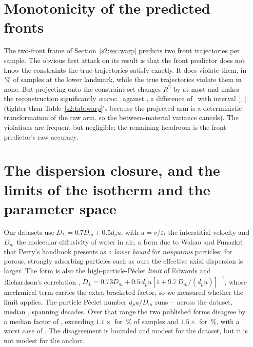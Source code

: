 \section{Monotonicity of the predicted fronts}
\label{s2:sec8}

The two-front frame of Section~\ref{s2:sec:warp} predicts two front trajectories per
sample. The obvious first attack on its result is that the front predictor does not know the constraints the true trajectories satisfy exactly.
It does violate them, in \nWarpNonmonoLo\,\% of samples at the lower landmark, while the true trajectories
violate them in none. But projecting onto the constraint set changes \(R^2\) by
at most \nWarpMonoMaxDRtwo{} and makes the reconstruction significantly
\emph{worse}: \nMonoRawNrmse\ against \nMonoProjNrmse, a difference of
\nMonoDiff\ with interval [\nMonoLo, \nMonoHi] (tighter than Table~\ref{s2:tab:warp}'s
because the projected arm is a deterministic transformation of the raw arm, so the
between-material variance cancels). The violations are frequent but negligible; the
remaining headroom is the front predictor's raw accuracy.

\section{The dispersion closure, and the limits of the isotherm and the parameter space}
\label{s2:sec9}

Our datasets use
\(D_L = 0.7 D_m + 0.5 d_p u\), with \(u = v/\varepsilon_t\) the interstitial velocity
and \(D_m\) the molecular diffusivity of water in air, a form due to Wakao
and Funazkri \cite{wakao1978effect} that Perry's handbook \cite{levan2019adsorption}
presents as a \emph{lower bound} for \emph{nonporous} particles; for porous, strongly
adsorbing particles such as ours the effective axial dispersion is larger. The form is
also the high-particle-P\'eclet \emph{limit} of Edwards and Richardson's correlation
\cite{edwards1968gas},
\(D_L = 0.73 D_m + 0.5\,d_p u\left[1 + 9.7\,D_m/(d_p u)\right]^{-1}\),
whose mechanical term carries the extra bracketed factor, so we measured whether the
limit applies.
The particle P\'eclet number \(d_p u / D_m\) runs
\nPePartMin--\nPePartMax\ across the dataset, median \nPePartMed, spanning
\nPePartDecades{} decades. Over that range the two published forms disagree by a
median factor of \nDispRatioMed, exceeding \(1.1\times\) for \nDispFracAboveTenPct\,\%
of samples and \(1.5\times\) for \nDispFracAboveHalf\,\%, with a worst case of
\nDispRatioMax. The disagreement is bounded and modest for the dataset, but it is
not modest for the anchor.

